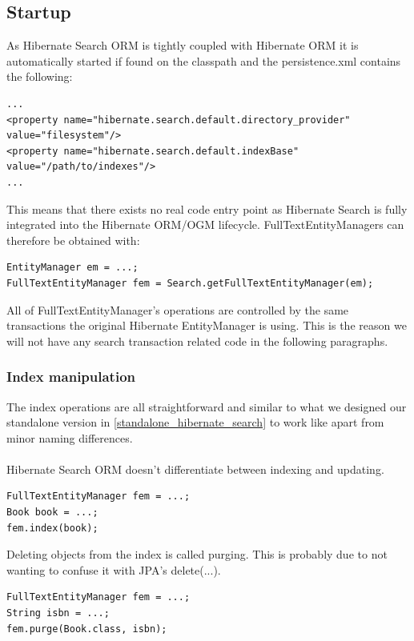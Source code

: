 \pagebreak

\subsection{Startup}
As Hibernate Search ORM is tightly coupled with Hibernate ORM it is automatically started if found on the classpath and the persistence.xml contains the following:
\\
\lstset{language=java}
\begin{lstlisting}[frame=htrbl, caption={Additions to persistence.xml with Hibernate Search ORM}, label={lst:hibernate_search_persistence.xml}]
...
<property name="hibernate.search.default.directory_provider"
value="filesystem"/>
<property name="hibernate.search.default.indexBase"
value="/path/to/indexes"/>
...
\end{lstlisting}
\noindent
This means that there exists no real code entry point as Hibernate Search is fully integrated into the Hibernate ORM/OGM lifecycle. FullTextEntityManagers can therefore be obtained with:
\\
\lstset{language=java}
\begin{lstlisting}[frame=htrbl, caption={Obtaining a FullTextEntityManager with Hibernate Search ORM}, label={lst:indexing_object_hsearch_orm_jpa.java}]
EntityManager em = ...;
FullTextEntityManager fem = Search.getFullTextEntityManager(em);
\end{lstlisting}
All of FullTextEntityManager's operations are controlled by the same transactions the original Hibernate EntityManager is using. This is the reason we will not have any search transaction related code in the following paragraphs.

\pagebreak

\subsubsection{Index manipulation}
The index operations are all straightforward and similar to what we designed our standalone version in \ref{standalone_hibernate_search} to work like apart from minor naming differences. 
\\\\
Hibernate Search ORM doesn't differentiate between indexing and updating.
\\
\lstset{language=java}
\begin{lstlisting}[frame=htrbl, caption={Indexing/Updating an object with Hibernate Search ORM}, label={lst:indexing_object_hsearch_orm_jpa.java}]
FullTextEntityManager fem = ...;
Book book = ...;
fem.index(book);
\end{lstlisting}
\noindent
Deleting objects from the index is called purging. This is probably due to not wanting to confuse it with JPA's delete(...).
\\
\lstset{language=java}
\begin{lstlisting}[frame=htrbl, caption={Deleting an object by id with Hibernate Search ORM}, label={lst:deleting_object_hsearch_orm_jpa.java}]
FullTextEntityManager fem = ...;
String isbn = ...;
fem.purge(Book.class, isbn);
\end{lstlisting}

